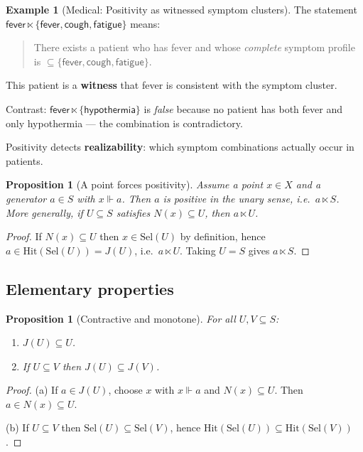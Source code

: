 \documentclass[11pt]{article}
\theoremstyle{definition}
\newtheorem{example}[definition]{Example}
\theoremstyle{plain}
\newtheorem{proposition}[definition]{Proposition}
\newcommand{\Hit}{\mathrm{Hit}}
\newcommand{\Sel}{\mathrm{Sel}}
\newcommand{\forces}{\Vdash}
\newcommand{\ltimesrel}{\ltimes}
\begin{document}
\begin{example}[Medical: Positivity as witnessed symptom clusters]\label{ex:medical-positivity}
The statement $\mathsf{fever} \ltimesrel \{\mathsf{fever}, \mathsf{cough}, \mathsf{fatigue}\}$ means:

\begin{quote}
There exists a patient who has fever and whose \emph{complete} symptom profile is $\subseteq \{\mathsf{fever}, \mathsf{cough}, \mathsf{fatigue}\}$.
\end{quote}

This patient is a \textbf{witness} that fever is consistent with the symptom cluster.

Contrast: $\mathsf{fever} \ltimesrel \{\mathsf{hypothermia}\}$ is \emph{false} because no patient
has both fever and only hypothermia --- the combination is contradictory.

Positivity detects \textbf{realizability}: which symptom combinations actually occur in patients.
\end{example}

\begin{proposition}[A point forces positivity]\label{prop:point-implies-positive}
Assume a point $x\in X$ and a generator $a\in S$ with $x\forces a$.
Then $a$ is positive in the unary sense, i.e.\ $a\ltimesrel S$.
More generally, if $U\subseteq S$ satisfies $N(x)\subseteq U$, then $a\ltimesrel U$.
\end{proposition}

\begin{proof}
If $N(x)\subseteq U$ then $x\in\Sel(U)$ by definition, hence $a\in\Hit(\Sel(U))=J(U)$,
i.e.\ $a\ltimesrel U$.  Taking $U=S$ gives $a\ltimesrel S$.
\end{proof}

\subsection{Elementary properties}

\begin{proposition}[Contractive and monotone]
For all $U,V\subseteq S$:
\begin{enumerate}[label=(\alph*)]
\item $J(U)\subseteq U$.
\item If $U\subseteq V$ then $J(U)\subseteq J(V)$.
\end{enumerate}
\end{proposition}

\begin{proof}
(a) If $a\in J(U)$, choose $x$ with $x\forces a$ and $N(x)\subseteq U$. Then $a\in N(x)\subseteq U$.

(b) If $U\subseteq V$ then $\Sel(U)\subseteq \Sel(V)$, hence $\Hit(\Sel(U))\subseteq \Hit(\Sel(V))$.
\end{proof}
\end{document}
